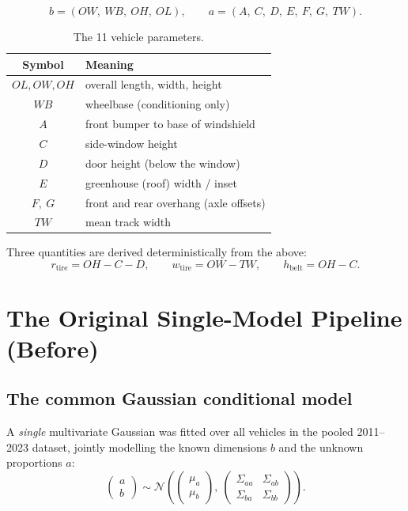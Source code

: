 \documentclass[11pt]{article}
\newcommand{\OL}{\mathit{OL}}
\newcommand{\OW}{\mathit{OW}}
\newcommand{\OH}{\mathit{OH}}
\newcommand{\WB}{\mathit{WB}}
\newcommand{\TW}{\mathit{TW}}
\theoremstyle{definition}
\begin{document}
\begin{equation}
b = (\OW,\ \WB,\ \OH,\ \OL), \qquad
a = (A,\ C,\ D,\ E,\ F,\ G,\ \TW).
\end{equation}

\begin{table}[h]
\centering
\begin{tabular}{cl}
\toprule
\textbf{Symbol} & \textbf{Meaning} \\
\midrule
$\OL,\OW,\OH$ & overall length, width, height \\
$\WB$ & wheelbase (conditioning only) \\
$A$ & front bumper to base of windshield \\
$C$ & side-window height \\
$D$ & door height (below the window) \\
$E$ & greenhouse (roof) width / inset \\
$F,\ G$ & front and rear overhang (axle offsets) \\
$\TW$ & mean track width \\
\bottomrule
\end{tabular}
\caption{The 11 vehicle parameters.}
\end{table}

\noindent Three quantities are derived deterministically from the above:
\begin{equation}
r_{\text{tire}} = \OH - C - D, \qquad
w_{\text{tire}} = \OW - \TW, \qquad
h_{\text{belt}} = \OH - C.
\end{equation}

\section{The Original Single-Model Pipeline (Before)}

\subsection{The common Gaussian conditional model}

A \emph{single} multivariate Gaussian was fitted over all vehicles in the pooled 2011--2023 dataset, jointly modelling the known dimensions $b$ and the unknown proportions $a$:
\begin{equation}
\begin{pmatrix} a \\ b \end{pmatrix}
\sim \mathcal{N}\!\left(
\begin{pmatrix} \mu_a \\ \mu_b \end{pmatrix},\
\begin{pmatrix} \Sigma_{aa} & \Sigma_{ab} \\ \Sigma_{ba} & \Sigma_{bb} \end{pmatrix}
\right).
\label{eq:joint}
\end{equation}
\end{document}

